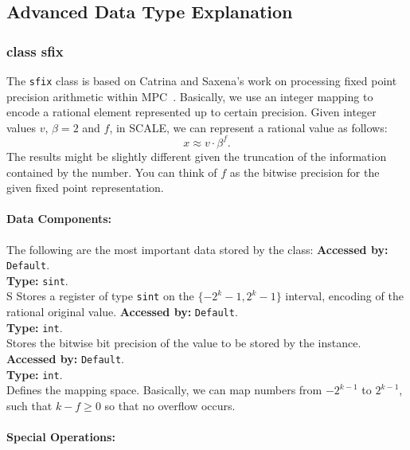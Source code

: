 \subsection{Advanced Data Type Explanation}
		
\subsubsection{class sfix}
The \verb|sfix| class is based on Catrina and Saxena's work on processing fixed point precision arithmetic within MPC~\cite{CS10}. Basically, we use an integer mapping to encode a rational element represented up to certain precision. 
Given integer values $v$, $\beta =2$ and $f$, in SCALE, we can represent a rational value as follows:
	\[
	  x \approx v \cdot \beta ^{f}.
	\]
The results might be slightly different given the truncation of the information contained by the number. You can think of $f$ as the bitwise precision for the given fixed point representation.

	\paragraph{Data Components:}
	The following are the most important data stored by the class:
	\textbf{Accessed by:} \verb|Default|.\\
	\textbf{Type:} \verb|sint|.\\
	S	Stores a register of type \verb|sint| on the $\{-2^k-1, 2^k-1\}$ interval, encoding of the rational original value.
	\textbf{Accessed by:} \verb|Default|.\\
	\textbf{Type:} \verb|int|.\\
	Stores the bitwise bit precision of the value to be stored by the instance.
	\textbf{Accessed by:} \verb|Default|.\\
	\textbf{Type:} \verb|int|.\\
	Defines the mapping space. Basically, we can map numbers  from $-2^{k-1}$ to $2^{k-1}$, such that $k-f \geq 0$ so that no overflow occurs.
	
	\paragraph {Special Operations:}

